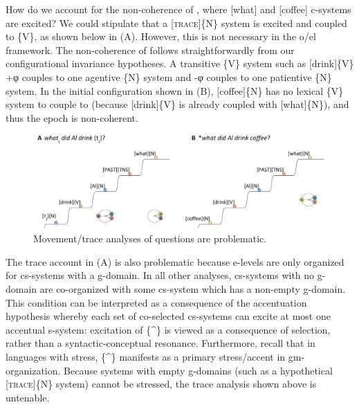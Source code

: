 \ea\label{ex:7:19}
  \label{ex:7:19a}
  \label{ex:7:19b}
\z
\z

  How do we account for the non-coherence of , where [what] and [coffee] c-systems are excited?  We could stipulate that a [\textsc{trace}]\{N\} system is excited and coupled to \{V\}, as shown below in {}(A). However, this is not necessary in the o/el framework. The non-coherence of  follows straightforwardly from our configurational invariance hypotheses. A transitive \{V\} system such as [drink]\{V\} +φ couples to one agentive \{N\} system and -φ couples to one patientive \{N\} system. In the initial configuration shown in {}(B), [coffee]\{N\} has no lexical \{V\} system to couple to (because [drink]\{V\} is already coupled with [what]\{N\}), and thus the epoch is non-coherent.

  
\begin{figure}
\includegraphics[width=\textwidth]{figures/Tilsen-img161.png}
\caption{Movement/trace analyses of questions are problematic.}
\label{fig:7:17}
\end{figure}
 

  The trace account in {}(A) is also problematic because e-levels are only organized for cs-systems with a g-domain. In all other analyses, cs-systems with no g-domain are co-organized with some cs-system which has a non-empty g-domain. This condition can be interpreted as a consequence of the accentuation hypothesis whereby each set of co-selected cs-systems can excite at most one accentual s-system: excitation of \{\^{}\} is viewed as a consequence of selection, rather than a syntactic-conceptual resonance. Furthermore, recall that in languages with stress, \{\^{}\} manifests as a primary stress/accent in gm-organization. Because systems with empty g-domains (such as a hypothetical [\textsc{trace}]\{N\} system) cannot be stressed, the trace analysis shown above is untenable.


